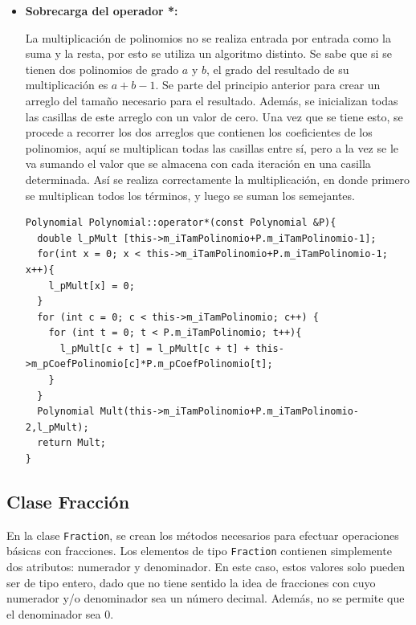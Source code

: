 \begin{itemize}
    \item \textbf{Sobrecarga del operador *:}
    
    La multiplicación de polinomios no se realiza entrada por entrada como la suma y la resta, por esto se utiliza un algoritmo distinto. Se sabe que si se tienen dos polinomios de grado $a$ y $b$, el grado del resultado de su multiplicación es $a+b-1$. Se parte del principio anterior para crear un arreglo del tamaño necesario para el resultado. Además, se inicializan todas las casillas de este arreglo con un valor de cero. Una vez que se tiene esto, se procede a recorrer los dos arreglos que contienen los coeficientes de los polinomios, aquí se multiplican todas las casillas entre sí, pero a la vez se le va sumando el valor que se almacena con cada iteración en una casilla determinada. Así se realiza correctamente la multiplicación, en donde primero se multiplican todos los términos, y luego se suman los semejantes.
    
    \begin{verbatim}
Polynomial Polynomial::operator*(const Polynomial &P){
  double l_pMult [this->m_iTamPolinomio+P.m_iTamPolinomio-1];
  for(int x = 0; x < this->m_iTamPolinomio+P.m_iTamPolinomio-1; x++){
    l_pMult[x] = 0;
  }
  for (int c = 0; c < this->m_iTamPolinomio; c++) {
    for (int t = 0; t < P.m_iTamPolinomio; t++){
      l_pMult[c + t] = l_pMult[c + t] + this->m_pCoefPolinomio[c]*P.m_pCoefPolinomio[t];
    }
  }
  Polynomial Mult(this->m_iTamPolinomio+P.m_iTamPolinomio-2,l_pMult);
  return Mult;
}
    \end{verbatim}
    
\end{itemize}

\subsection{Clase Fracción}

En la clase \texttt{Fraction}, se crean los métodos necesarios para efectuar operaciones básicas con fracciones. Los elementos de tipo \texttt{Fraction} contienen simplemente dos atributos: numerador y denominador. En este caso, estos valores solo pueden ser de tipo entero, dado que no tiene sentido la idea de fracciones con cuyo numerador y/o denominador sea un número decimal. Además, no se permite que el denominador sea 0.

